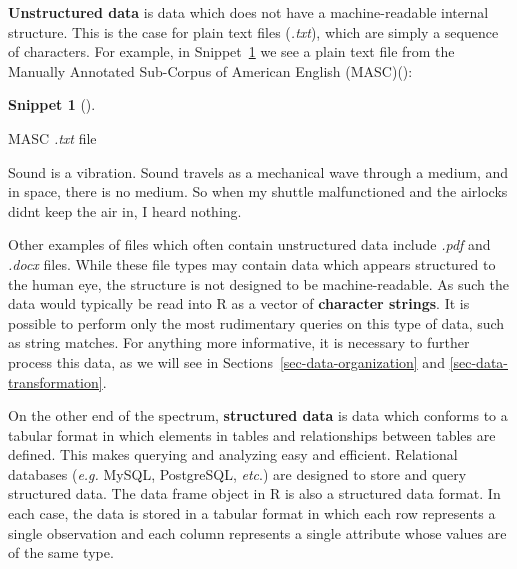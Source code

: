 \documentclass[
  letterpaper,
  krantz1]{latex/krantz-mod}
\newenvironment{Shaded}{\begin{snugshade}}{\end{snugshade}}
\newcommand{\NormalTok}[1]{\textcolor[rgb]{0.00,0.00,0.00}{#1}}
\theoremstyle{definition}
\newtheorem{definition}{Snippet}[chapter]
\theoremstyle{definition}
\theoremstyle{remark}
\begin{document}
\textbf{Unstructured data} is data which does
not have a machine-readable internal structure. This is the case for
plain text files (\emph{.txt}), which are simply
a sequence of characters. For example, in Snippet~\ref{def-masc-text} we
see a plain text file from the Manually Annotated Sub-Corpus of American
English
(MASC)():

\begin{definition}[]\protect\hypertarget{def-masc-text}{}\label{def-masc-text}

MASC \emph{.txt} file

\begin{Shaded}
\begin{Highlighting}[]
\NormalTok{Sound is a vibration. Sound travels as a mechanical wave through a medium, and in space, there is no medium. So when my shuttle malfunctioned and the airlocks didn\textquotesingle{}t keep the air in, I heard nothing.}
\end{Highlighting}
\end{Shaded}

\end{definition}

Other examples of files which often contain unstructured data include
\emph{.pdf} and \emph{.docx}
files. While these file types may contain
data which appears structured to the human eye, the structure is not
designed to be machine-readable. As such the data would typically be
read into R as a vector of \textbf{character
strings}. It is possible to perform only the
most rudimentary queries on this type of data, such as string matches.
For anything more informative, it is necessary to further process this
data, as we will see in Sections~\ref{sec-data-organization} and
\ref{sec-data-transformation}.

On the other end of the spectrum, \textbf{structured
data} is data which conforms to a tabular format
in which elements in tables and relationships between tables are
defined. This makes querying and analyzing easy and efficient.
Relational databases (\emph{e.g.} MySQL,
PostgreSQL, \emph{etc}.) are designed to store and query structured
data. The data frame object in R is also a structured
data format. In each case, the data is stored in a tabular format in
which each row represents a single observation and
each column represents a single attribute whose values
are of the same type.
\end{document}
